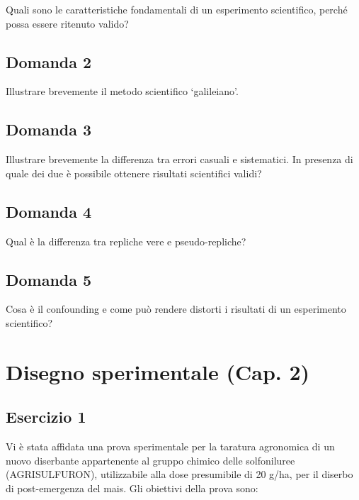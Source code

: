 \documentclass[a4paper,12pt,oneside]{book}
\begin{document}
Quali sono le caratteristiche fondamentali di un esperimento scientifico, perché possa essere ritenuto valido?

\hypertarget{domanda-2}{%
\subsection{Domanda 2}\label{domanda-2}}

Illustrare brevemente il metodo scientifico `galileiano'.

\hypertarget{domanda-3}{%
\subsection{Domanda 3}\label{domanda-3}}

Illustrare brevemente la differenza tra errori casuali e sistematici. In presenza di quale dei due è possibile ottenere risultati scientifici validi?

\hypertarget{domanda-4}{%
\subsection{Domanda 4}\label{domanda-4}}

Qual è la differenza tra repliche vere e pseudo-repliche?

\hypertarget{domanda-5}{%
\subsection{Domanda 5}\label{domanda-5}}

Cosa è il confounding e come può rendere distorti i risultati di un esperimento scientifico?

\hypertarget{disegno-sperimentale-cap.-2}{%
\section{Disegno sperimentale (Cap. 2)}\label{disegno-sperimentale-cap.-2}}

\hypertarget{esercizio-1}{%
\subsection{Esercizio 1}\label{esercizio-1}}

Vi è stata affidata una prova sperimentale per la taratura agronomica di un nuovo diserbante appartenente al gruppo chimico delle solfoniluree (AGRISULFURON), utilizzabile alla dose presumibile di 20 g/ha, per il diserbo di post-emergenza del mais. Gli obiettivi della prova sono:
\end{document}
